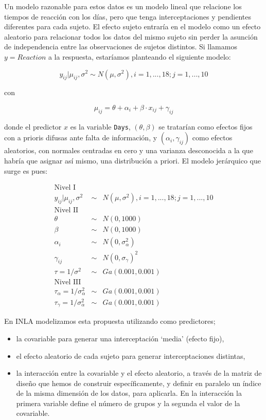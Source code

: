 \documentclass[
]{book}
\providecommand{\tightlist}{%
  \setlength{\itemsep}{0pt}\setlength{\parskip}{0pt}}
\begin{document}
Un modelo razonable para estos datos es un modelo lineal que relacione los tiempos de reacción con los días, pero que tenga interceptaciones y pendientes diferentes para cada sujeto. El efecto sujeto entraría en el modelo como un efecto aleatorio para relacionar todos los datos del mismo sujeto sin perder la asunción de independencia entre las observaciones de sujetos distintos. Si llamamos \(y=Reaction\) a la respuesta, estaríamos planteando el siguiente modelo:

\[ y_{ij}|\mu_{ij},\sigma^2 \sim N(\mu,\sigma^2), i=1,...,18; j=1, ...,10\]

con

\[\mu_{ij}=\theta + \alpha_i + \beta \cdot x_{ij} + \gamma_{ij}\]

donde el predictor \(x\) es la variable \texttt{Days}, \((\theta,\beta)\) se tratarían como efectos fijos con a prioris difusas ante falta de información, y \((\alpha_i,\gamma_{ij})\) como efectos aleatorios, con normales centradas en cero y una varianza desconocida a la que habría que asignar así mismo, una distribución a priori. El modelo jerárquico que surge es pues:

\begin{eqnarray*}
\text{Nivel I} && \\
y_{ij}|\mu_{ij},\sigma^2 &\sim& N(\mu,\sigma^2), i=1,...,18; j=1, ...,10 \\
\text{Nivel II} && \\
\theta &\sim & N(0,1000) \\
\beta &\sim& N(0,1000) \\
\alpha_i &\sim& N(0,\sigma_{\alpha}^2) \\
\gamma_{ij} &\sim & N(0,\sigma_{\gamma})^2 \\
\tau=1/\sigma^2 &\sim& Ga(0.001,0.001)\\
\text{Nivel III} && \\
\tau_{\alpha}=1/\sigma_{\alpha}^2 &\sim& Ga(0.001,0.001) \\
\tau_{\gamma}=1/\sigma_{\alpha}^2 &\sim& Ga(0.001,0.001) \end{eqnarray*}

En INLA modelizamos esta propuesta utilizando como predictores;

\begin{itemize}
\tightlist
\item
  la covariable para generar una interceptación `media' (efecto fijo),
\item
  el efecto aleatorio de cada sujeto para generar interceptaciones distintas,
\item
  la interacción entre la covariable y el efecto aleatorio, a través de la matriz de diseño que hemos de construir específicamente, y definir en paralelo un índice de la misma dimensión de los datos, para aplicarla. En la interacción la primera variable define el número de grupos y la segunda el valor de la covariable.
\end{itemize}
\end{document}
